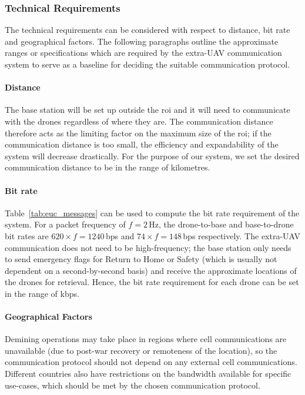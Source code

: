 \subsubsection{Technical Requirements}

The technical requirements can be considered with respect to distance, bit rate and geographical factors. The following paragraphs outline the approximate ranges or specifications which are required by the extra-\gls{UAV} communication system to serve as a baseline for deciding the suitable communication protocol.

\paragraph{Distance} The base station will be set up outside the \gls{roi} and it will need to communicate with the drones regardless of where they are. The communication distance therefore acts as the limiting factor on the maximum size of the \gls{roi}; if the communication distance is too small, the efficiency and expandability of the system will decrease drastically. For the purpose of our system, we set the desired communication distance to be in the range of kilometres. 

\paragraph{Bit rate} Table~\ref{tab:euc_messages} can be used to compute the bit rate requirement of the system. For a packet frequency of $f=2$\,Hz, the drone-to-base and base-to-drone bit rates are $620 \times f=1240$\,bps and $74 \times f=148$\,bps respectively. The extra-\gls{UAV} communication does not need to be high-frequency; the base station only needs to send emergency flags for Return to Home or Safety (which is usually not dependent on a second-by-second basis) and receive the approximate locations of the drones for retrieval. Hence, the bit rate requirement for each drone can be set in the range of kbps. 

\paragraph{Geographical Factors} Demining operations may take place in regions where cell communications are unavailable (due to post-war recovery or remoteness of the location), so the communication protocol should not depend on any external cell communications. Different countries also have restrictions on the bandwidth available for specific use-cases, which should be met by the chosen communication protocol. 

